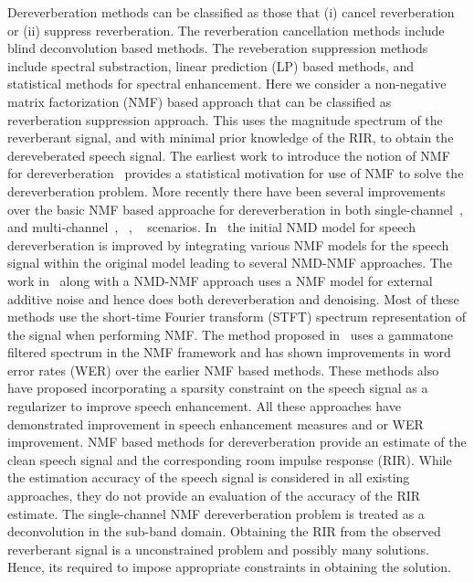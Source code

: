 Dereverberation methods can be classified as those that (i) cancel reverberation or
(ii) suppress reverberation. The reverberation cancellation methods include blind
deconvolution based methods. The reveberation suppression methods include
spectral substraction, linear prediction (LP) based methods, and statistical
methods for spectral enhancement. Here we consider a non-negative matrix
factorization (NMF) based approach that can be classified as reverberation suppression
approach. This uses the magnitude spectrum of the reverberant signal, and with
minimal prior knowledge of the RIR, to obtain the dereveberated speech signal.
The earliest work to introduce the notion of NMF for
dereverberation~\cite{kameoka2009robust} provides a statistical motivation for use of NMF
to solve the dereverberation problem. More recently there have been several
improvements over the basic NMF based approache for dereverberation in both
single-channel~\cite{Mohammadiha2016, baby2016supervised, Mohammadiha2015, Kallasjoki2014, Kumar2011}, and multi-channel~\cite{Yu2012}, ~\cite{Yu2014}, ~\cite{Mirsamadi2014} scenarios.
In~\cite{Mohammadiha2016, Mohammadiha2015} the initial NMD model for speech
dereverberation is improved by integrating various NMF models for the speech
signal within the original model leading to several NMD-NMF approaches. The work
in~\cite{baby2016supervised} along with a NMD-NMF approach uses a NMF model for external
additive noise and hence does both dereverberation and denoising. Most of
these methods use the short-time Fourier transform (STFT) spectrum representation of the
signal when performing NMF. The method proposed in~\cite{Kumar2011} uses a
gammatone filtered spectrum in the NMF framework and has shown improvements in
word error rates (WER) over the earlier NMF based methods. These methods also
have proposed incorporating a sparsity constraint on the speech signal as a
regularizer to improve speech enhancement. All these approaches
have demonstrated improvement in speech enhancement measures
and or WER improvement. NMF based methods for dereverberation provide an
estimate of the clean speech signal and the corresponding room impulse response
(RIR). While the estimation accuracy of the speech signal is considered in all
existing approaches, they do not provide an evaluation of the accuracy of the
RIR estimate. The single-channel NMF dereverberation problem is treated as a
deconvolution in the sub-band domain. Obtaining the RIR from the observed
reverberant signal is a unconstrained problem and possibly many solutions.
Hence, its required to impose appropriate constraints in obtaining the solution.
